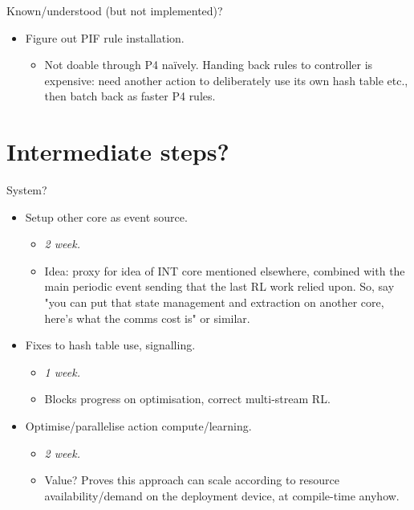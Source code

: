 \documentclass[sigconf,natbib=false]{acmart}
\begin{document}
Known/understood (but not implemented)?
\begin{itemize}
	\item Figure out PIF rule installation.
	\begin{itemize}
		\item Not doable through P4 na\"{i}vely. Handing back rules to controller is expensive: need another action to deliberately use its own hash table etc., then batch back as faster P4 rules.
	\end{itemize}
\end{itemize}

\section{Intermediate steps?}
System?
\begin{itemize}
	\item Setup other core as event source.
	\begin{itemize}
		\item \emph{\num{2} week.}
		\item Idea: proxy for idea of INT core mentioned elsewhere, combined with the main periodic event sending that the last RL work relied upon. So, say "you can put that state management and extraction on another core, here's what the comms cost is" or similar.
	\end{itemize}
	\item Fixes to hash table use, signalling.
	\begin{itemize}
		\item \emph{\num{1} week.}
		\item Blocks progress on optimisation, correct multi-stream RL.
	\end{itemize}
	\item Optimise/parallelise action compute/learning.
	\begin{itemize}
		\item \emph{\num{2} week.}
		\item Value? Proves this approach can scale according to resource availability/demand on the deployment device, at compile-time anyhow.
	\end{itemize}
\end{itemize}
\end{document}
